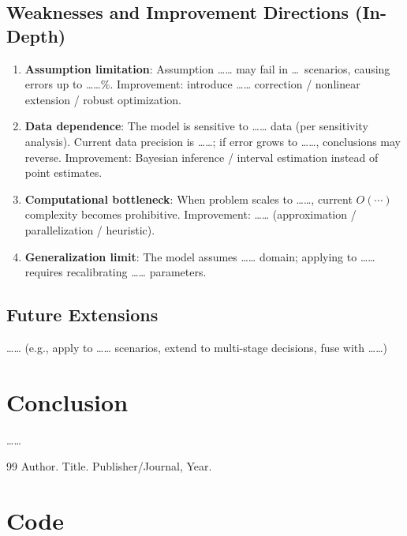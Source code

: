 \documentclass[12pt]{article}
\begin{document}
\subsection{Weaknesses and Improvement Directions (In-Depth)}
\begin{enumerate}[label=(\arabic*)]
  \item \textbf{Assumption limitation}: Assumption …… may fail in \ldots\ scenarios,
        causing errors up to ……\%. Improvement: introduce …… correction /
        nonlinear extension / robust optimization.
  \item \textbf{Data dependence}: The model is sensitive to …… data (per sensitivity
        analysis). Current data precision is ……; if error grows to ……,
        conclusions may reverse. Improvement: Bayesian inference /
        interval estimation instead of point estimates.
  \item \textbf{Computational bottleneck}: When problem scales to ……,
        current $O(\cdots)$ complexity becomes prohibitive.
        Improvement: …… (approximation / parallelization / heuristic).
  \item \textbf{Generalization limit}: The model assumes …… domain; applying to
        …… requires recalibrating …… parameters.
\end{enumerate}

\subsection{Future Extensions}
…… (e.g., apply to …… scenarios, extend to multi-stage decisions, fuse with ……)

\section{Conclusion}
……

\begin{thebibliography}{99}
 Author. Title. Publisher/Journal, Year.
\end{thebibliography}

\appendix
\section{Code}

\end{document}
